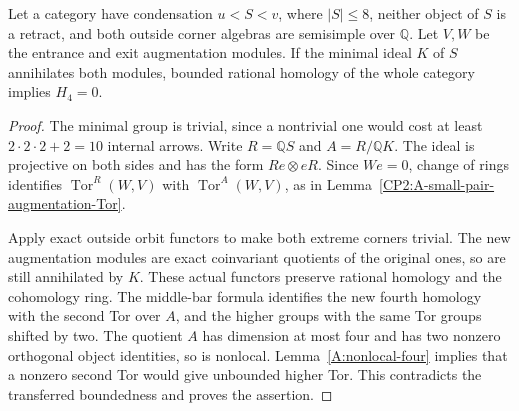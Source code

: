 \begin{lemma}
\label{CP2:A-eight-pair-annihilated-augmentation-Tor}
Let a category have condensation $u<S<v$, where $|S|\le8$,
neither object of $S$ is a retract, and both outside corner
algebras are semisimple over $\mathbb Q$. Let $V,W$ be the
entrance and exit augmentation modules. If the minimal ideal
$K$ of $S$ annihilates both modules, bounded rational homology
of the whole category implies $H_4=0$.
\end{lemma}
\begin{proof}
The minimal group is trivial, since a nontrivial one would cost
at least $2\cdot2\cdot2+2=10$ internal arrows. Write
$R=\mathbb QS$ and $A=R/\mathbb QK$. The ideal is projective
on both sides and has the form $Re\otimes eR$. Since $We=0$,
change of rings identifies $\operatorname{Tor}^R(W,V)$ with
$\operatorname{Tor}^A(W,V)$, as in
Lemma~\ref{CP2:A-small-pair-augmentation-Tor}.

Apply exact outside orbit functors to make both extreme corners
trivial. The new augmentation modules are exact coinvariant
quotients of the original ones, so are still annihilated by $K$.
These actual functors preserve rational homology and the cohomology
ring. The middle-bar formula identifies the new fourth homology
with the second Tor over $A$, and the higher groups with the same
Tor groups shifted by two. The quotient $A$ has dimension at most
four and has two nonzero orthogonal object identities, so is
nonlocal. Lemma~\ref{A:nonlocal-four} implies that a nonzero
second Tor would give unbounded higher Tor. This contradicts the
transferred boundedness and proves the assertion.
\end{proof}

